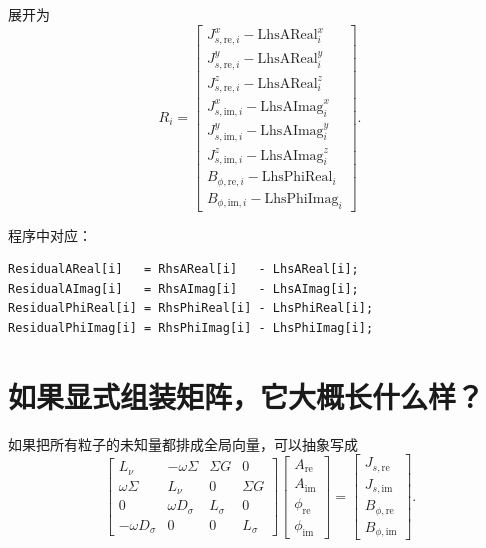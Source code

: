 \documentclass[UTF8,11pt]{ctexart}
\begin{document}
展开为
\begin{equation}
    R_i
    =
    \begin{bmatrix}
    J^x_{s,\mathrm{re},i} - \mathrm{LhsAReal}_i^x\\
    J^y_{s,\mathrm{re},i} - \mathrm{LhsAReal}_i^y\\
    J^z_{s,\mathrm{re},i} - \mathrm{LhsAReal}_i^z\\
    J^x_{s,\mathrm{im},i} - \mathrm{LhsAImag}_i^x\\
    J^y_{s,\mathrm{im},i} - \mathrm{LhsAImag}_i^y\\
    J^z_{s,\mathrm{im},i} - \mathrm{LhsAImag}_i^z\\
    B_{\phi,\mathrm{re},i} - \mathrm{LhsPhiReal}_i\\
    B_{\phi,\mathrm{im},i} - \mathrm{LhsPhiImag}_i
    \end{bmatrix}.
\end{equation}

程序中对应：
\begin{lstlisting}
ResidualAReal[i]   = RhsAReal[i]   - LhsAReal[i];
ResidualAImag[i]   = RhsAImag[i]   - LhsAImag[i];
ResidualPhiReal[i] = RhsPhiReal[i] - LhsPhiReal[i];
ResidualPhiImag[i] = RhsPhiImag[i] - LhsPhiImag[i];
\end{lstlisting}

\section{如果显式组装矩阵，它大概长什么样？}

如果把所有粒子的未知量都排成全局向量，可以抽象写成
\begin{equation}
\begin{bmatrix}
L_{\nu} & -\omega\Sigma & \Sigma G & 0\\
\omega\Sigma & L_{\nu} & 0 & \Sigma G\\
0 & \omega D_{\sigma} & L_{\sigma} & 0\\
-\omega D_{\sigma} & 0 & 0 & L_{\sigma}
\end{bmatrix}
\begin{bmatrix}
A_{\mathrm{re}}\\
A_{\mathrm{im}}\\
\phi_{\mathrm{re}}\\
\phi_{\mathrm{im}}
\end{bmatrix}
=
\begin{bmatrix}
J_{s,\mathrm{re}}\\
J_{s,\mathrm{im}}\\
B_{\phi,\mathrm{re}}\\
B_{\phi,\mathrm{im}}
\end{bmatrix}.
\label{eq:block-global}
\end{equation}
\end{document}
